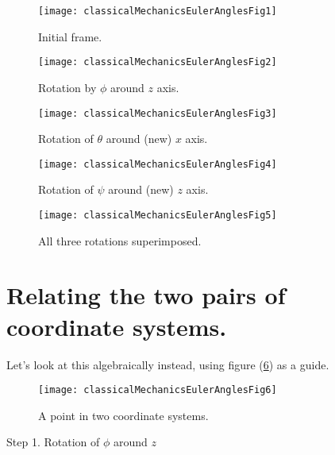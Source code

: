 \begin{figure}[htp]
   \centering
   \texttt{[image: classicalMechanicsEulerAnglesFig1]}
   \caption{Initial frame.}\label{fig:classicalMechanicsEulerAngles:classicalMechanicsEulerAnglesFig1}
\end{figure}
\begin{figure}[htp]
   \centering
   \texttt{[image: classicalMechanicsEulerAnglesFig2]}
   \caption{Rotation by $\phi$ around $z$ axis.}\label{fig:classicalMechanicsEulerAngles:classicalMechanicsEulerAnglesFig2}
\end{figure}
\begin{figure}[htp]
   \centering
   \texttt{[image: classicalMechanicsEulerAnglesFig3]}
   \caption{Rotation of $\theta$ around (new) $x$ axis.}\label{fig:classicalMechanicsEulerAngles:classicalMechanicsEulerAnglesFig3}
\end{figure}
\begin{figure}[htp]
   \centering
   \texttt{[image: classicalMechanicsEulerAnglesFig4]}
   \caption{Rotation of $\psi$ around (new) $z$ axis.}\label{fig:classicalMechanicsEulerAngles:classicalMechanicsEulerAnglesFig4}
\end{figure}

\begin{figure}[htp]
   \centering
   \texttt{[image: classicalMechanicsEulerAnglesFig5]}
   \caption{All three rotations superimposed.}\label{fig:classicalMechanicsEulerAngles:classicalMechanicsEulerAnglesFig5}
\end{figure}

\section{Relating the two pairs of coordinate systems.}

Let's look at this algebraically instead, using figure (\ref{fig:classicalMechanicsEulerAngles:classicalMechanicsEulerAnglesFig6}) as a guide.

\begin{figure}[htp]
   \centering
   \texttt{[image: classicalMechanicsEulerAnglesFig6]}
   \caption{A point in two coordinate systems.}\label{fig:classicalMechanicsEulerAngles:classicalMechanicsEulerAnglesFig6}
\end{figure}

Step 1.  Rotation of $\phi$ around $z$

